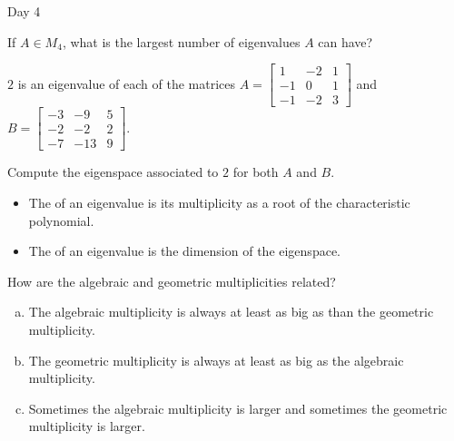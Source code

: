 
\begin{applicationActivities}{Day 4}

\begin{activity}
  If $A \in M_4$, what is the largest number of eigenvalues $A$ can have?
\end{activity}

\begin{activity}
  $2$ is an eigenvalue of each of the matrices $A=\begin{bmatrix} 1 & -2 & 1 \\ -1 & 0 & 1 \\ -1 & -2 & 3\end{bmatrix}$ and $B=\begin{bmatrix} -3 & -9 & 5 \\ -2 & -2 & 2 \\ -7 & -13 & 9 \end{bmatrix}$.

  Compute the eigenspace associated to $2$ for both $A$ and $B$.
\end{activity}

\begin{definition}

\begin{itemize}
\item The  of an eigenvalue is its multiplicity as a root of the characteristic polynomial.
\item The  of an eigenvalue is the dimension of the eigenspace.
\end{itemize}

\end{definition}

\begin{activity} How are the algebraic and geometric multiplicities related?
\begin{enumerate}[(a)]
\item The algebraic multiplicity is always at least as big as than the geometric multiplicity.
\item The geometric multiplicity is always at least as big as the algebraic multiplicity.
\item Sometimes the algebraic multiplicity is larger and sometimes the geometric multiplicity is larger.
\end{enumerate}
\end{activity}


\end{applicationActivities}
